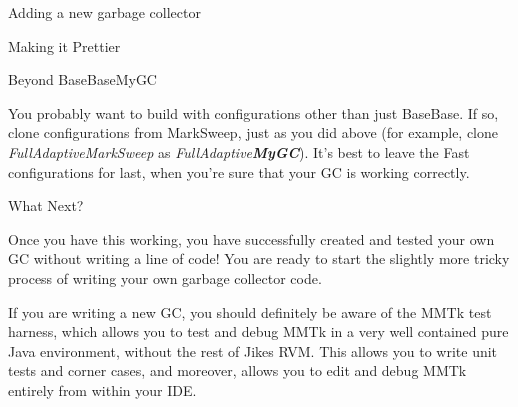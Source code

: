\begin{section}{Adding a new garbage collector}
\begin{subsection}{Making it Prettier}
\end{subsection}

\begin{subsection}{Beyond BaseBaseMyGC}

You probably want to build with configurations other than just BaseBase.  If so, clone configurations from MarkSweep, just as you did above (for example, clone \textit{FullAdaptiveMarkSweep} as \textit{FullAdaptive\textbf{MyGC}}). It's best to leave the Fast configurations for last, when you're sure that your GC is working correctly.

\end{subsection}

\begin{subsection}{What Next?}

Once you have this working, you have successfully created and tested your own GC without writing a line of code! You are ready to start the slightly more tricky process of writing your own garbage collector code.

If you are writing a new GC, you should definitely be aware of the MMTk test harness, which allows you to test and debug MMTk in a very well contained pure Java environment, without the rest of Jikes RVM.  This allows you to write unit tests and corner cases, and moreover, allows you to edit and debug MMTk entirely from within your IDE.

\end{subsection}

\end{section}


